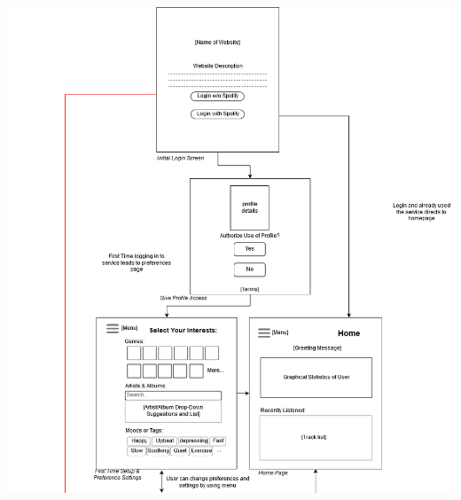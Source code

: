 \documentclass[letter, 11pt]{article}
\begin{document}
\includegraphics[scale=0.57,left]{storyboard_1_mobile.png} \\
\end{document}

